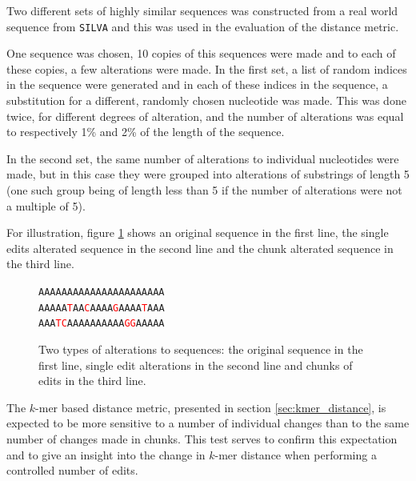 %

Two different sets of highly similar sequences was constructed from a real
world sequence from \texttt{SILVA} and this was used in the evaluation of the
distance metric.

One sequence was chosen, 10 copies of this sequences were made and to each of
these copies, a few alterations were made. In the first set, a list of random
indices in the sequence were generated and in each of these indices in the
sequence, a substitution for a different, randomly chosen nucleotide was made.
This was done twice, for different degrees of alteration, and the number of
alterations was equal to respectively 1\% and 2\% of the length of the
sequence.

In the second set, the same number of alterations to individual nucleotides
were made, but in this case they were grouped into alterations of substrings of
length 5 (one such group being of length less than 5 if the number of
alterations were not a multiple of 5).

For illustration, figure \ref{fig:alterations} shows an original sequence in
the first line, the single edits alterated sequence in the second line and the
chunk alterated sequence in the third line.

\newcommand{\tc}[1]{\textcolor{red}{#1}}
\begin{figure}[H]
  \centering
  \texttt{AAAAAAAAAAAAAAAAAAAAAA} \\
  \texttt{AAAAA\tc{T}AA\tc{C}AAAA\tc{G}AAAA\tc{T}AAA} \\
  \texttt{AAA\tc{TC}AAAAAAAAAA\tc{GG}AAAAA}
  \caption{Two types of alterations to sequences: the original sequence in the
    first line, single edit alterations in the second line and chunks of edits
    in the third line.}
  \label{fig:alterations}
\end{figure}

The $k$-mer based distance metric, presented in section
\ref{sec:kmer_distance}, is expected to be more sensitive to a number of
individual changes than to the same number of changes made in chunks. This test
serves to confirm this expectation and to give an insight into the change in
$k$-mer distance when performing a controlled number of edits.

